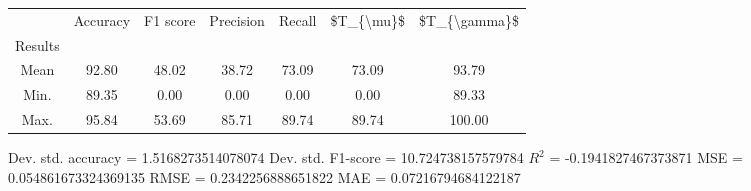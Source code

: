 \begin{tabular}{|c|c|c|c|c|c|c|}
\toprule
{} &  Accuracy &  F1 score &  Precision &  Recall &  \$T\_\{\textbackslash mu\}\$ &  \$T\_\{\textbackslash gamma\}\$ \\
Results &           &           &            &         &            &               \\
\hline
Mean    &     92.80 &     48.02 &      38.72 &   73.09 &      73.09 &         93.79 \\
Min.    &     89.35 &      0.00 &       0.00 &    0.00 &       0.00 &         89.33 \\
Max.    &     95.84 &     53.69 &      85.71 &   89.74 &      89.74 &        100.00 \\
\bottomrule
\end{tabular}

 Dev. std. accuracy = 1.5168273514078074
 Dev. std. F1-score = 10.724738157579784
 $R^2$ = -0.1941827467373871
 MSE = 0.054861673324369135
 RMSE = 0.2342256888651822
 MAE = 0.07216794684122187